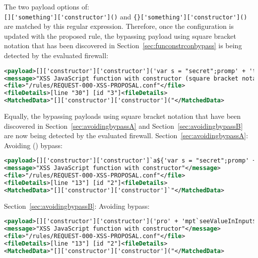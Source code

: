 The two payload options of: \\
\verb|[]['something']['constructor']()| and \verb|{}['something']['constructor']()| \\
are matched by this regular expression. Therefore, once the configuration is updated with the proposed rule, the bypassing payload using square bracket notation that has been discovered in Section~\ref{sec:funconstrconbypass} is being detected by the evaluated firewall:

\begin{lstlisting}[style=ruleStyle, language=XML, caption=function constructor bypass payload using square bracket notation blocked, label={lst:constructorsblockedsbn}]
<payload>[]['constructor']['constructor']('var s = "secret";promp' + 't("something", s)')()</payload>
<message>"XSS JavaScript function with constructor (square bracket notation)"</message>
<file>"/rules/REQUEST-000-XSS-PROPOSAL.conf"</file>
<fileDetails>[line "30"] [id "3"]<fileDetails>
<MatchedData>"[]['constructor']['constructor']("</MatchedData>
\end{lstlisting}

Equally, the bypassing payloads using square bracket notation that have been discovered in Section~\ref{sec:avoidingbypassA} and  Section~\ref{sec:avoidingbypassB} are now being detected by the evaluated firewall. Section~\ref{sec:avoidingbypassA}: Avoiding () bypass:

\begin{lstlisting}[style=ruleStyle, language=XML, caption=avoiding () bypass payload using square bracket notation blocked, label={lst:constructorsblockedsbnA}]
<payload>[]['constructor']['constructor']`a${'var s = "secret";promp' + 't`something\u{0024}{s}`'}```</payload>
<message>"XSS JavaScript function with constructor"</message>
<file>"/rules/REQUEST-000-XSS-PROPOSAL.conf"</file>
<fileDetails>[line "13"] [id "2"]<fileDetails>
<MatchedData>"[]['constructor']['constructor']`"</MatchedData>
\end{lstlisting}

Section~\ref{sec:avoidingbypassB}: Avoiding {} bypass:

\begin{lstlisting}[style=ruleStyle, language=XML, caption=avoiding {} bypass payload using square bracket notation blocked, label={lst:constructorsblockedsbnB}]
<payload>[]['constructor']['constructor']('pro' + 'mpt`seeValueInInput$' + [open + []][0][16] + '2+2' + [open + []][0][36] + ':`')();</payload>
<message>"XSS JavaScript function with constructor"</message>
<file>"/rules/REQUEST-000-XSS-PROPOSAL.conf"</file>
<fileDetails>[line "13"] [id "2"]<fileDetails>
<MatchedData>"[]['constructor']['constructor']("</MatchedData>
\end{lstlisting}

